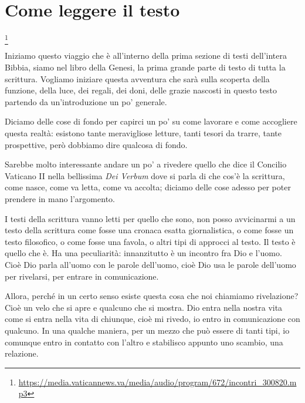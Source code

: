 
\chapter{Come leggere il testo}

\footnote{\url{https://media.vaticannews.va/media/audio/program/672/incontri_300820.mp3}}

Iniziamo questo viaggio che è all'interno della prima sezione di testi dell'intera Bibbia, siamo nel libro della Genesi, la prima grande parte di testo di tutta la scrittura. Vogliamo iniziare questa avventura che sarà sulla scoperta della funzione, della luce, dei regali, dei doni, delle grazie nascosti in questo testo partendo da un'introduzione un po' generale. 

Diciamo delle cose di fondo per capirci un po' su come lavorare e come accogliere questa realtà: esistono tante meravigliose letture, tanti tesori da trarre, tante prospettive, però dobbiamo dire qualcosa di fondo. 

Sarebbe molto interessante andare un po' a rivedere quello che dice il Concilio Vaticano II nella bellissima \textit{Dei Verbum} dove si parla di che cos'è la scrittura, come nasce, come va letta, come va accolta; diciamo delle cose adesso per poter prendere in mano l'argomento.

I testi della scrittura vanno letti per quello che sono, non posso avvicinarmi a un testo della scrittura come fosse una cronaca esatta giornalistica, o come fosse un testo filosofico, o come fosse una favola, o altri tipi di approcci al testo. Il testo è quello che è. Ha una peculiarità: innanzitutto è un incontro fra Dio e l'uomo. Cioè Dio parla all'uomo con le parole dell'uomo, cioè Dio usa le parole dell'uomo per rivelarsi, per entrare in comunicazione.

Allora, perché in un certo senso esiste questa cosa che noi chiamiamo rivelazione? Cioè un velo che si apre e qualcuno che si mostra. Dio entra nella nostra vita come si entra nella vita di chiunque, cioè mi rivedo, io entro in comunicazione con qualcuno. In una qualche maniera, per un mezzo che può essere di tanti tipi, io comunque entro in contatto con l'altro e stabilisco appunto uno scambio, una relazione.

\newpage

